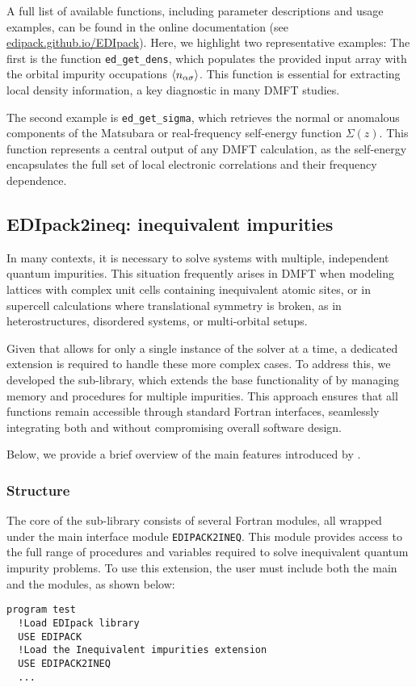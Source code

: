 \documentclass[edipack_sp.tex]{subfiles}
\begin{document}
A full list of available functions, including parameter descriptions 
and usage examples, can be found in the online documentation (see \href{https://edipack.github.io/EDIpack/}{edipack.github.io/EDIpack}).  
Here, we highlight two representative examples:
The first is the function \texttt{ed\_get\_dens}, which populates the 
provided input array with the orbital impurity occupations 
$\langle n_{\alpha\sigma}\rangle$. This function is essential for extracting 
local density information, a key diagnostic in many DMFT studies.

The second example is \texttt{ed\_get\_sigma}, which retrieves the 
normal or anomalous components of the Matsubara or real-frequency 
self-energy function $\Sigma(z)$. This function represents a central 
output of any DMFT calculation, as the self-energy encapsulates the 
full set of local electronic correlations and their frequency 
dependence.







\subsection{EDIpack2ineq: inequivalent impurities}\label{sSecIneq}
In many contexts, it is necessary to solve systems with multiple, 
independent quantum impurities. This situation frequently arises in 
DMFT when modeling lattices with complex unit cells containing 
inequivalent atomic sites, or in supercell calculations where 
translational symmetry is broken, as in heterostructures, disordered 
systems, or multi-orbital setups. 

Given that \NAME allows for only a single instance of the solver at a 
time, a dedicated extension is required to handle these more complex 
cases. To address this, we developed the  
sub-library, which extends the base functionality of \NAME by managing 
memory and procedures for multiple impurities. This approach ensures 
that all functions remain accessible through standard Fortran 
interfaces, seamlessly integrating both \NAME and  
without compromising overall software design.

Below, we provide a brief overview of the main features introduced by 
.

\subsubsection{Structure}\label{ssSecIneqStructure}
The core of the  sub-library consists of several 
Fortran modules, all wrapped under the main interface module 
{\tt EDIPACK2INEQ}. This module provides access to the full range of 
procedures and variables required to solve inequivalent quantum 
impurity problems. To use this extension, the user must include both 
the main \NAME and the  modules, as shown below:
\begin{lstlisting}[style=fstyle,numbers=none,basicstyle={\scriptsize\ttfamily}]
program test
  !Load EDIpack library 
  USE EDIPACK
  !Load the Inequivalent impurities extension
  USE EDIPACK2INEQ
  ...
\end{lstlisting}
\end{document}
